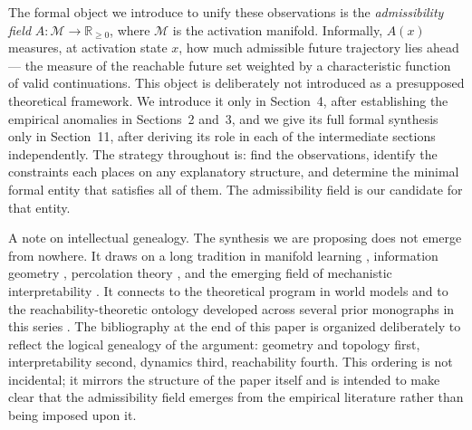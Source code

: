 \documentclass[12pt, a4paper]{article}
\theoremstyle{plain}
\theoremstyle{definition}
\theoremstyle{remark}
\newcommand{\R}{\mathbb{R}}
\newcommand{\cM}{\mathcal{M}}
\begin{document}
The formal object we introduce to unify these observations is the
\emph{admissibility field} $A:\cM \to \R_{\geq 0}$, where $\cM$ is the
activation manifold. Informally, $A(x)$ measures, at activation state $x$,
how much admissible future trajectory lies ahead --- the measure of the
reachable future set weighted by a characteristic function of valid
continuations. This object is deliberately not introduced as a presupposed
theoretical framework. We introduce it only in Section~4, after establishing
the empirical anomalies in Sections~2 and~3, and we give its full formal
synthesis only in Section~11, after deriving its role in each of the
intermediate sections independently. The strategy throughout is: find the
observations, identify the constraints each places on any explanatory
structure, and determine the minimal formal entity that satisfies all of them.
The admissibility field is our candidate for that entity.

A note on intellectual genealogy. The synthesis we are proposing does not
emerge from nowhere. It draws on a long tradition in manifold learning
\cite{tenenbaum2000isomap, roweis2000lle, coifman2006diffusion}, information
geometry \cite{amari2016information}, percolation theory
\cite{stauffer1994percolation, newman2018networks}, and the emerging field of
mechanistic interpretability \cite{olah2020circuits, elhage2022toy,
bricken2023monosemantic, cunningham2023sae}. It connects to the theoretical
program in world models \cite{ha2018worldmodels, lecun2022path,
stapf2026wmsd} and to the reachability-theoretic ontology developed across
several prior monographs in this series \cite{flyxion2026reachability,
flyxion2026hidden, flyxion2026admissibility, flyxion2026frozen}. The
bibliography at the end of this paper is organized deliberately to reflect the
logical genealogy of the argument: geometry and topology first, interpretability
second, dynamics third, reachability fourth. This ordering is not incidental;
it mirrors the structure of the paper itself and is intended to make clear that
the admissibility field emerges from the empirical literature rather than being
imposed upon it.
\end{document}
